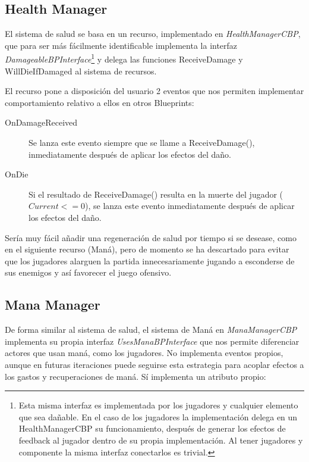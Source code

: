 \documentclass[12pt]{report}
\begin{document}
\subsection{Health Manager}

El sistema de salud se basa en un recurso, implementado en \textit{\emph{HealthManagerCBP}}, que para ser más fácilmente identificable implementa la interfaz \textit{\emph{DamageableBPInterface}}\footnote{Esta misma interfaz es implementada por los jugadores y cualquier elemento que sea dañable. En el caso de los jugadores la implementación delega en un HealthManagerCBP su funcionamiento, después de generar los efectos de feedback al jugador dentro de su propia implementación. Al tener jugadores y componente la misma interfaz conectarlos es trivial.} y delega las funciones ReceiveDamage y WillDieIfDamaged al sistema de recursos.

El recurso pone a disposición del usuario 2 eventos que nos permiten implementar comportamiento relativo a ellos en otros Blueprints:

\begin{description}
	\item[OnDamageReceived] Se lanza este evento siempre que se llame a ReceiveDamage(), inmediatamente después de aplicar los efectos del daño.
	\item[OnDie] Si el resultado de ReceiveDamage() resulta en la muerte del jugador ($Current <= 0$), se lanza este evento inmediatamente después de aplicar los efectos del daño.
\end{description}

Sería muy fácil añadir una regeneración de salud por tiempo si se desease, como en el siguiente recurso (Maná), pero de momento se ha descartado para evitar que los jugadores alarguen la partida innecesariamente jugando a esconderse de sus enemigos y así favorecer el juego ofensivo.

\subsection{Mana Manager}

De forma similar al sistema de salud, el sistema de Maná en \textit{\emph{ManaManagerCBP}} implementa su propia interfaz \textit{\emph{UsesManaBPInterface}} que nos permite diferenciar actores que usan maná, como los jugadores. No implementa eventos propios, aunque en futuras iteraciones puede seguirse esta estrategia para acoplar efectos a los gastos y recuperaciones de maná. Sí implementa un atributo propio:
\end{document}

